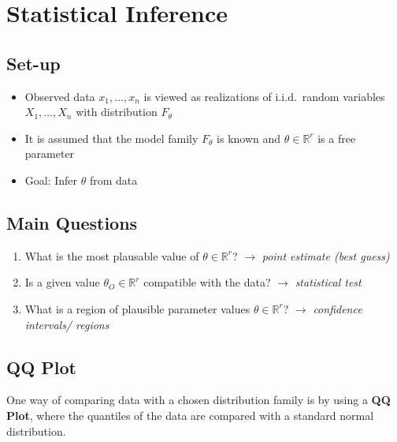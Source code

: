 \section{Statistical Inference}
\subsection{Set-up}
\begin{itemize}
    \item Observed data $x_1,\ldots, x_n$ is viewed as realizations of i.i.d.\ random variables $X_1,\ldots, X_n$ with distribution $F_\theta$
    \item It is assumed that the model family $F_\theta$ is known and $\theta\in \mathbb{R}^r$ is a free parameter
    \item Goal: Infer $\theta$ from data
\end{itemize}

\subsection{Main Questions}
\begin{enumerate}
    \item What is the most plausable value of  $\theta\in \mathbb{R}^r$?\newline
          $\to$ \textit{point estimate (best guess)}
    \item Is a given value  $\theta_O\in \mathbb{R}^r$ compatible with the data?\newline
          $\to$ \textit{statistical test}
    \item What is a region of plausible parameter values  $\theta\in \mathbb{R}^r$?\newline
          $\to$ \textit{confidence intervals/ regions}
\end{enumerate}

\subsection{QQ Plot}
One way of comparing data with a chosen distribution family is by using a \textbf{QQ Plot},
where the quantiles of the data are compared with a standard normal distribution.


